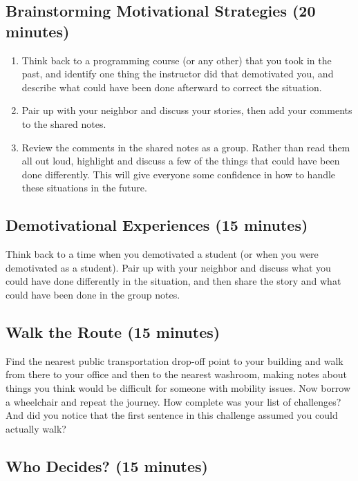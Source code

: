 \documentclass[10pt,statementpaper]{memoir}
\begin{document}
\subsection{Brainstorming Motivational Strategies (20
minutes)}\label{brainstorming-motivational-strategies-20-minutes}

\begin{enumerate}
\def\labelenumi{\arabic{enumi}.}
\item
  Think back to a programming course (or any other) that you took in the
  past, and identify one thing the instructor did that demotivated you,
  and describe what could have been done afterward to correct the
  situation.
\item
  Pair up with your neighbor and discuss your stories, then add your
  comments to the shared notes.
\item
  Review the comments in the shared notes as a group. Rather than read
  them all out loud, highlight and discuss a few of the things that
  could have been done differently. This will give everyone some
  confidence in how to handle these situations in the future.
\end{enumerate}

\subsection{Demotivational Experiences (15
minutes)}\label{demotivational-experiences-15-minutes}

Think back to a time when you demotivated a student (or when you were
demotivated as a student). Pair up with your neighbor and discuss what
you could have done differently in the situation, and then share the
story and what could have been done in the group notes.

\subsection{Walk the Route (15
minutes)}\label{walk-the-route-15-minutes}

Find the nearest public transportation drop-off point to your building
and walk from there to your office and then to the nearest washroom,
making notes about things you think would be difficult for someone with
mobility issues. Now borrow a wheelchair and repeat the journey. How
complete was your list of challenges? And did you notice that the first
sentence in this challenge assumed you could actually walk?

\subsection{Who Decides? (15 minutes)}\label{who-decides-15-minutes}
\end{document}
